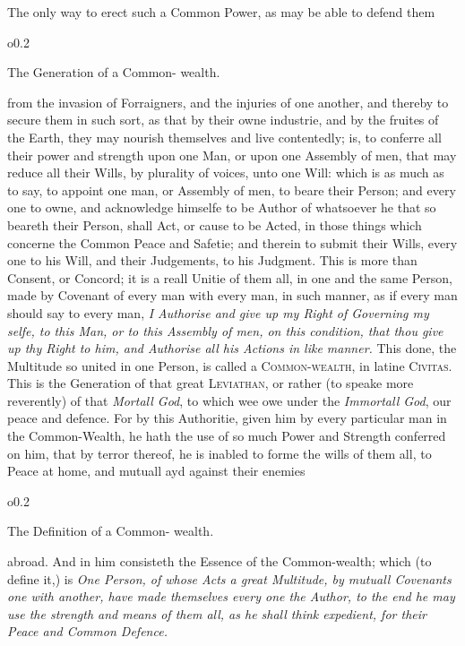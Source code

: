 The only way to erect such a Common Power, as may be able to defend
them \begin{wrapfigure}[4]{o}{0.2\textwidth}\raggedright The
Generation of a Common- wealth. \end{wrapfigure} from the invasion of
Forraigners, and the injuries of one another, and thereby to secure
them in such sort, as that by their owne industrie, and by the fruites
of the Earth, they may nourish themselves and live contentedly; is, to
conferre all their power and strength upon one Man, or upon one
Assembly of men, that may reduce all their Wills, by plurality of
voices, unto one Will: which is as much as to say, to appoint one man,
or Assembly of men, to beare their Person; and every one to owne, and
acknowledge himselfe to be Author of whatsoever he that so beareth
their Person, shall Act, or cause to be Acted, in those things which
concerne the Common Peace and Safetie; and therein to submit their
Wills, every one to his Will, and their Judgements, to his Judgment.
This is more than Consent, or Concord; it is a reall Unitie of them
all, in one and the same Person, made by Covenant of every man with
every man, in such manner, as if every man should say to every man,
\textit{I Authorise and give up my Right of Governing my selfe, to
this Man, or to this Assembly of men, on  this condition,
that thou give up thy Right to him, and Authorise all his Actions in
like manner.} This done, the Multitude so united in one Person, is
called a \textsc{Common-wealth}, in latine \textsc{Civitas}. This is
the Generation of that great \textsc{Leviathan}, or rather (to speake
more reverently) of that \textit{Mortall God}, to which wee owe under
the \textit{Immortall God}, our peace and defence. For by this
Authoritie, given him by every particular man in the Common-Wealth, he
hath the use of so much Power and Strength conferred on him, that by
terror thereof, he is inabled to forme the wills of them all, to Peace
at home, and mutuall ayd against their enemies

\noindent\begin{wrapfigure}[4]{o}{0.2\textwidth}\raggedright The
Definition of a Common- wealth. \end{wrapfigure} abroad. And in him
consisteth the Essence of the Common-wealth; which (to define it,) is
\textit{One Person, of whose Acts a great Multitude, by mutuall
Covenants one with another, have made themselves every one the Author,
to the end he may use the strength and means of them all, as he shall
think expedient, for their Peace and Common Defence.}

